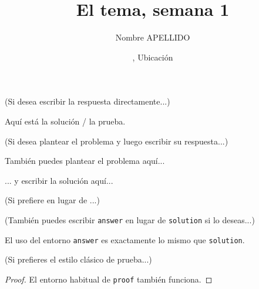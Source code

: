 \documentclass[11pt,
  logo = {example-image},
  title in boldface,
  theorem in new line,
]{homework}
\title{El tema, semana 1}
\author{Nombre APELLIDO}
\date{\TheDate{2023-12-25}, Ubicación}
\begin{document}
\bigskip\textcolor{gray!55}{(Si desea escribir la respuesta directamente...)}

\begin{problem}
    Aquí está la solución / la prueba.
\end{problem}


\bigskip\textcolor{gray!55}{(Si desea plantear el problema y luego escribir su respuesta...)}

\begin{problem}
    También puedes plantear el problema aquí...
\end{problem}

\begin{solution}
    ... y escribir la solución aquí...
\end{solution}

\bigskip\textcolor{gray!55}{(Si prefiere  en lugar de ...)}



\bigskip\textcolor{gray!55}{(También puedes escribir \texttt{answer} en lugar de \texttt{solution} si lo deseas...)}

\begin{answer}
    El uso del entorno \verb|answer| es exactamente lo mismo que \verb|solution|.
\end{answer}


\bigskip\textcolor{gray!55}{(Si prefieres el estilo clásico de prueba...)}

\begin{proof}
    El entorno habitual de \verb|proof| también funciona.
\end{proof}


\end{document}
